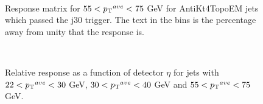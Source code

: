 \begin{figure}
\centering
\mbox{
}
\caption[The response matrix for jets with $55<\ptave{}<75$ GeV]{
Response matrix for $55<\ptave{}<75$ GeV for AntiKt4TopoEM jets which passed the j30 trigger. 
The text in the bins is the percentage away from unity that the response is.
\label{JetPerf:ResponseMatrix_55_75_j30}}
\end{figure}


\begin{figure}
\centering
\mbox{
}
\caption[Relative response as a function of $\eta$]{
Relative response as a function of detector $\eta$ for jets with $22<\mbox{$\mbox{$p_{\rm T}$}{}^{ave}$}{}<30$ GeV, $30<\mbox{$\mbox{$p_{\rm T}$}{}^{ave}$}{}<40$ GeV and $55<\ptave{}<75$ GeV.
\label{JetPerf:PtComp}}
\end{figure}


